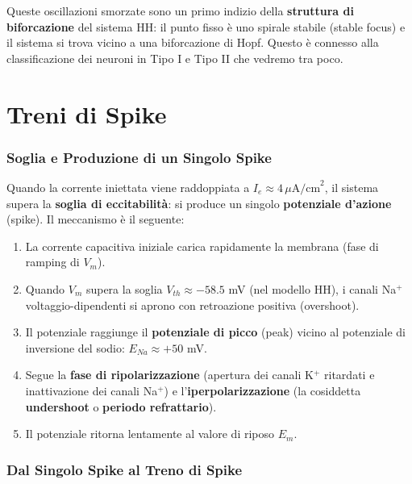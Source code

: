 \begin{tcolorbox}[colback=gray!5, colframe=gray!40, arc=2mm, boxrule=0.5pt]
Queste oscillazioni smorzate sono un primo indizio della \textbf{struttura di biforcazione} del sistema HH: il punto fisso è uno spirale stabile (stable focus) e il sistema si trova vicino a una biforcazione di Hopf. Questo è connesso alla classificazione dei neuroni in Tipo I e Tipo II che vedremo tra poco.
\end{tcolorbox}



\section{Treni di Spike}

\subsubsection{Soglia e Produzione di un Singolo Spike}

Quando la corrente iniettata viene raddoppiata a $I_e \approx 4 \, \mu\text{A/cm}^2$, il sistema supera la \textbf{soglia di eccitabilità}: si produce un singolo \textbf{potenziale d'azione} (spike). Il meccanismo è il seguente:

\begin{enumerate}
    \item La corrente capacitiva iniziale carica rapidamente la membrana (fase di ramping di $V_m$).
    \item Quando $V_m$ supera la soglia $V_{th} \approx -58.5$ mV (nel modello HH), i canali Na$^+$ voltaggio-dipendenti si aprono con retroazione positiva (overshoot).
    \item Il potenziale raggiunge il \textbf{potenziale di picco} (peak) vicino al potenziale di inversione del sodio: $E_{Na} \approx +50$ mV.
    \item Segue la \textbf{fase di ripolarizzazione} (apertura dei canali K$^+$ ritardati e inattivazione dei canali Na$^+$) e l'\textbf{iperpolarizzazione} (la cosiddetta \textbf{undershoot} o \textbf{periodo refrattario}).
    \item Il potenziale ritorna lentamente al valore di riposo $E_m$.
\end{enumerate}


\subsubsection{Dal Singolo Spike al Treno di Spike}

